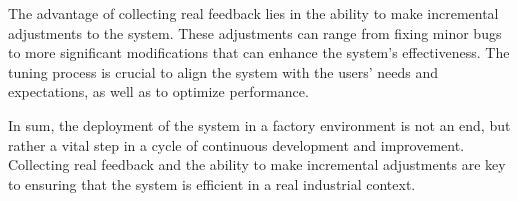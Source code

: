The advantage of collecting real feedback lies in the ability to make incremental adjustments to the system. These adjustments can range from fixing minor bugs to more significant modifications that can enhance the system's effectiveness. The tuning process is crucial to align the system with the users' needs and expectations, as well as to optimize performance.

In sum, the deployment of the system in a factory environment is not an end, but rather a vital step in a cycle of continuous development and improvement. Collecting real feedback and the ability to make incremental adjustments are key to ensuring that the system is efficient in a real industrial context.